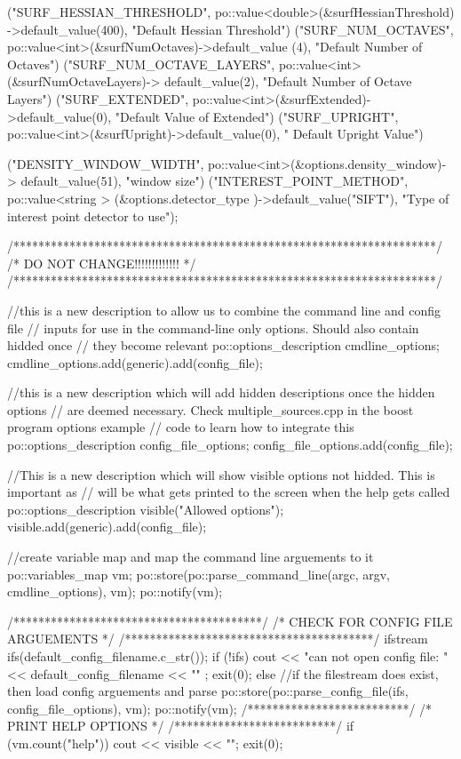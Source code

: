 \begin{DoxyCode}
{            ("SURF_HESSIAN_THRESHOLD", po::value<double>(&surfHessianThreshold)
      ->default_value(400), "Default Hessian Threshold")
            ("SURF_NUM_OCTAVES", po::value<int>(&surfNumOctaves)->default_value
      (4), "Default Number of Octaves")
            ("SURF_NUM_OCTAVE_LAYERS", po::value<int>(&surfNumOctaveLayers)->
      default_value(2), "Default Number of Octave Layers")
            ("SURF_EXTENDED", po::value<int>(&surfExtended)->default_value(0), 
      "Default Value of Extended")
            ("SURF_UPRIGHT", po::value<int>(&surfUpright)->default_value(0), "
      Default Upright Value")

            ("DENSITY_WINDOW_WIDTH", po::value<int>(&options.density_window)->
      default_value(51), "window size")
            ("INTEREST_POINT_METHOD", po::value<string > (&options.detector_type
      )->default_value("SIFT"), "Type of interest point detector to use");


    /********************************************************************/
    /*                                                  DO NOT
       CHANGE!!!!!!!!!!!!!                              */
    /********************************************************************/

    //this is a new description to allow us to combine the command line and
       config file
    // inputs for use in the command-line only options. Should also contain
       hidded once
    // they become relevant
    po::options_description cmdline_options;
    cmdline_options.add(generic).add(config_file);

    //this is a new description which will add hidden descriptions once the
       hidden options
    // are deemed necessary. Check multiple_sources.cpp in the boost program
       options example
    // code to learn how to integrate this
    po::options_description config_file_options;
    config_file_options.add(config_file);

    //This is a new description which will show visible options not hidded.
       This is important as
    // will be what gets printed to the screen when the help gets called
    po::options_description visible("Allowed options");
    visible.add(generic).add(config_file);

    //create variable map and map the command line arguements to it
    po::variables_map vm;
    po::store(po::parse_command_line(argc, argv, cmdline_options), vm);
    po::notify(vm);

    /****************************************/
    /* CHECK FOR CONFIG FILE ARGUEMENTS */
    /****************************************/
    ifstream ifs(default_config_filename.c_str());
    if (!ifs) {
        cout << "can not open config file: " << default_config_filename << "\n"
      ;
        exit(0);
    } else {
        //if the filestream does exist, then load config arguements and parse
        po::store(po::parse_config_file(ifs, config_file_options), vm);
        po::notify(vm);
    }
    /**************************/
    /* PRINT HELP OPTIONS */
    /**************************/
    if (vm.count("help")) {
        cout << visible << "\n";
        exit(0);
    }


}
\end{DoxyCode}
